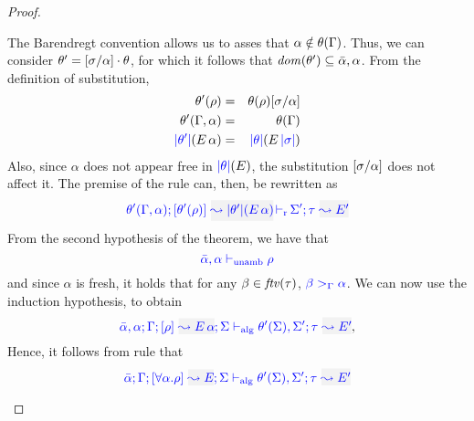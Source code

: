 \begin{proof}
\begin{description}
The Barendregt convention allows us to asses that $\alpha\notin\theta(\Gamma)$. Thus, we can
consider $\theta'=[\sigma/\alpha]\cdot\theta$, for which it follows that
${\it dom }{(\theta')}\subseteq\bar\alpha,\alpha$. From the definition of substitution,
\begin{eqnarray*}
  \theta'(\rho) & = & \theta(\rho)[\sigma/\alpha]\\
  \theta'(\Gamma,\alpha) & = & \theta(\Gamma)\\
  {\color{blue} |\theta'|}(E\,\alpha) & = & {\color{blue} |\theta|}(E\,{\color{blue} |\sigma|})
\end{eqnarray*}
Also, since $\alpha$ does not appear free in ${\color{blue} |\theta|}(E)$, the substitution
$[\sigma/\alpha]$ does not affect it.
The premise of the rule can, then, be rewritten as
\begin{equation*}
  \dmres{\theta'(\tenv,\alpha)}{\theta'(\rulet)}{\etrans{\theta'}(\mmapp{E}{\alpha})}{\type}{E'}{\Sigma'}
\end{equation*}
From the second hypothesis of the theorem, we have that
\begin{equation*}
  {\color{blue} \bar\alpha,\alpha \vdash_{\mathrm{unamb}}\rho}
\end{equation*}
and since $\alpha$ is fresh, it holds that for any $\beta\in{\it ftv }(\tau)$,
${\color{blue} \beta >_{\Gamma} \alpha}$. We can now use the induction hypothesis, to obtain
\begin{equation*}
  \admres{\bar\alpha,\alpha}{\tenv}{\rulet}{\mmapp{E}{\alpha}}{\Sigma}{\type}{E'}{\theta'(\Sigma),\Sigma'}
,\end{equation*}
Hence, it follows from rule  that
\begin{equation*}
\admres{\bar\alpha}{\tenv}{\tall{\alpha}{\rulet}}{E}{\Sigma}{\type}{E'}{\theta'(\Sigma),\Sigma'}
\end{equation*}


\end{description}
\end{proof}


